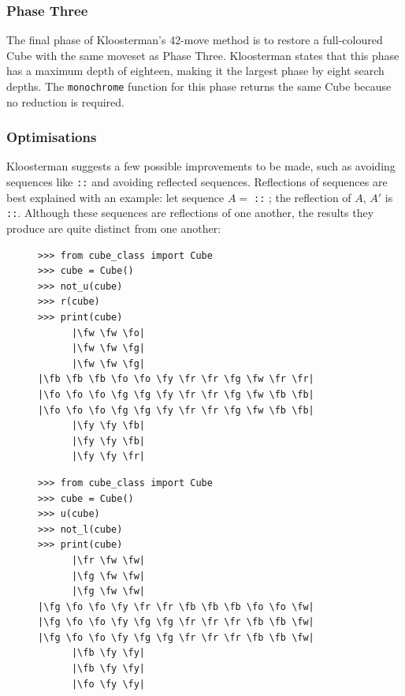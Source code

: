 \documentclass{report}
\newcommand{\movesequence}[1]{\uppercase{\texttt{:\formatmoves{#1}:}}}
\newcommand{\fw}{\color{gray}W }
\newcommand{\fo}{\color{orange}O }
\newcommand{\fg}{\color{green}G }
\newcommand{\fr}{\color{red}R }
\newcommand{\fb}{\color{blue}B }
\newcommand{\fy}{\color{yellow}Y }
\begin{document}
	\subsubsection{Phase Three}
	
	The final phase of Kloosterman's 42-move method is to restore a full-coloured Cube with the same moveset as Phase Three. Kloosterman states that this phase has a maximum depth of eighteen, making it the largest phase by eight search depths. The \lstinline|monochrome| function for this phase returns the same Cube because no reduction is required.
	
	\subsubsection{Optimisations}
	
	Kloosterman suggests a few possible improvements to be made, such as avoiding sequences like \movesequence{l2r2l"} and avoiding reflected sequences. Reflections of sequences are best explained with an example: let sequence $A =\;$\movesequence{u'r} ; the reflection of $A$, $A'$ is \movesequence{u.l@}. Although these sequences are reflections of one another, the results they produce are quite distinct from one another:
	
	
	\begin{figure}[H]
		\centering
		\begin{minipage}{0.4\textwidth}
			\begin{lstlisting}[caption={Performing sequence $A$}, label={lst:reflection1}]
>>> from cube_class import Cube
>>> cube = Cube()
>>> not_u(cube)
>>> r(cube)
>>> print(cube)
      |\fw \fw \fo|
      |\fw \fw \fg|
      |\fw \fw \fg|
|\fb \fb \fb \fo \fo \fy \fr \fr \fg \fw \fr \fr|
|\fo \fo \fo \fg \fg \fy \fr \fr \fg \fw \fb \fb|
|\fo \fo \fo \fg \fg \fy \fr \fr \fg \fw \fb \fb|
      |\fy \fy \fb|
      |\fy \fy \fb|
      |\fy \fy \fr|\end{lstlisting}
		\end{minipage}%
		\hspace{10mm}
		\begin{minipage}{0.4\textwidth}
			\begin{lstlisting}[caption={Perform $A$'s reflection, $A'$}, label={lst:reflection2}]
>>> from cube_class import Cube
>>> cube = Cube()
>>> u(cube)
>>> not_l(cube)
>>> print(cube)
      |\fr \fw \fw|
      |\fg \fw \fw|
      |\fg \fw \fw|
|\fg \fo \fo \fy \fr \fr \fb \fb \fb \fo \fo \fw|
|\fg \fo \fo \fy \fg \fg \fr \fr \fr \fb \fb \fw|
|\fg \fo \fo \fy \fg \fg \fr \fr \fr \fb \fb \fw|
      |\fb \fy \fy|
      |\fb \fy \fy|
      |\fo \fy \fy|\end{lstlisting}\end{minipage}\end{figure}
  
\end{document}
